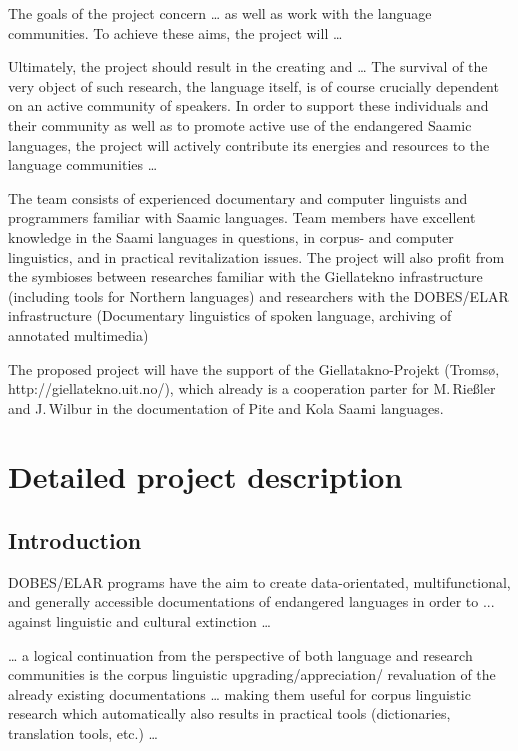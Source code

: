 \documentclass[a4paper,12pt]{article}
\begin{document}
The goals of the project concern … as well as work with the language communities. To achieve these aims, the project will …

Ultimately, the project should result in the creating and … The survival of the very object of such research, the language itself, is of course crucially dependent on an active community of speakers. In order to support these individuals and their community as well as to promote active use of the endangered Saamic languages, the project will actively contribute its energies and resources to the language communities …

The team consists of experienced documentary and computer linguists and programmers familiar with Saamic languages. Team members have excellent knowledge in the Saami languages in questions, in corpus- and computer linguistics, and in practical revitalization issues. The project will also profit from the symbioses between researches familiar with the Giellatekno infrastructure (including tools for Northern languages) and researchers with the DOBES/ELAR infrastructure (Documentary linguistics of spoken language, archiving of annotated multimedia)

The proposed project will have the support of the {Giellatakno-Projekt} (Tromsø, http://giellatekno.uit.no/), which already is a cooperation parter for M.\,Rießler and J.\,Wilbur in the documentation of Pite and Kola Saami languages. 

\section{Detailed project description}%
\subsection{Introduction}

DOBES/ELAR programs have the aim to create data-orientated, multifunctional, and generally accessible documentations of endangered languages in order to ... against linguistic and cultural extinction … 
 
… a logical continuation from the perspective of both language and research communities is the corpus linguistic upgrading/appreciation/
revaluation of the already existing documentations … making them useful for corpus linguistic research which automatically also results in practical tools (dictionaries, translation tools, etc.) …
\end{document}
